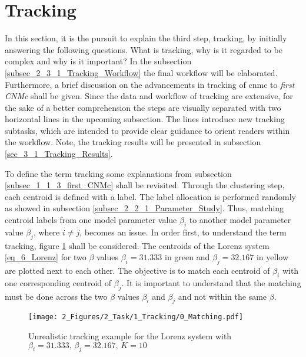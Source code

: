 \section{Tracking}
\label{sec_2_3_Tracking}
In this section, it is the pursuit to explain the third step, tracking, by initially answering the following questions. 
What is tracking, why is it regarded to be complex and why is it important? 
In the subsection \ref{subsec_2_3_1_Tracking_Workflow} the final workflow will be elaborated. Furthermore, a brief discussion on the advancements in tracking of \gls{cnmc} to \emph{first CNMc} shall be given. 
Since the data and workflow of tracking are extensive, for the sake of a better comprehension the steps are visually separated with two horizontal lines in the upcoming subsection. 
The lines introduce new tracking subtasks, which are intended to provide clear guidance to orient readers within the workflow.
Note, the tracking results will be presented in subsection \ref{sec_3_1_Tracking_Results}. \newline

To define the term tracking some explanations from subsection \ref{subsec_1_1_3_first_CNMc} shall be revisited.
Through the clustering step, each centroid is defined with a label.
The label allocation is performed randomly as showed in subsection \ref{subsec_2_2_1_Parameter_Study}.
Thus, matching centroid labels from one model parameter value $\beta_i$ to 
another model parameter value $\beta_j$, where $i \neq j$, becomes an issue.
In order first, to understand the term tracking, figure \ref{fig_21} shall be considered. 
The centroids of the Lorenz system \eqref{eq_6_Lorenz} for two $\beta$ values $\beta_i = 31.333$ in green and $\beta_j = 32.167$ in yellow are plotted next to each other.
The objective is to match each centroid of $\beta_i$ with one corresponding centroid of $\beta _j$.
It is important to understand that the matching must be done across the two $\beta $ values $\beta_i$ and $\beta_j$ and not within the same $\beta$.\newline 

\begin{figure}[!h]
    \centering
    \texttt{[image: 2\_Figures/2\_Task/1\_Tracking/0\_Matching.pdf]}
    \caption{Unrealistic tracking example for the Lorenz system with $\beta_i=31.333, \, \beta_j=32.167, \, K = 10$}
    \label{fig_21}    
\end{figure}

